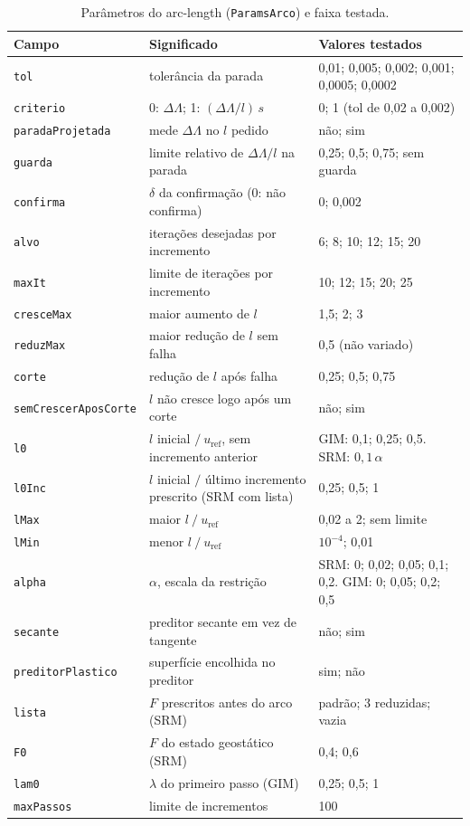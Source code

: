 \documentclass[11pt,a4paper]{article}
\numberwithin{equation}{section}
\begin{document}
\begin{table}[htbp]
\centering\footnotesize
\caption{Parâmetros do arc-length (\texttt{ParamsArco}) e faixa testada.}\label{tab:params_arco}
\begin{tabular}{lp{7.6cm}p{4.6cm}}
\toprule
Campo & Significado & Valores testados \\
\midrule
\texttt{tol} & tolerância da parada & 0,01; 0,005; 0,002; 0,001; 0,0005; 0,0002 \\
\texttt{criterio} & 0: $\Delta\Lambda$; 1: $(\Delta\Lambda/l)\,s$ & 0; 1 (tol de 0,02 a 0,002) \\
\texttt{paradaProjetada} & mede $\Delta\Lambda$ no $l$ pedido & não; sim \\
\texttt{guarda} & limite relativo de $\Delta\Lambda/l$ na parada & 0,25; 0,5; 0,75; sem guarda \\
\texttt{confirma} & $\delta$ da confirmação (0: não confirma) & 0; 0,002 \\
\texttt{alvo} & iterações desejadas por incremento & 6; 8; 10; 12; 15; 20 \\
\texttt{maxIt} & limite de iterações por incremento & 10; 12; 15; 20; 25 \\
\texttt{cresceMax} & maior aumento de $l$ & 1,5; 2; 3 \\
\texttt{reduzMax} & maior redução de $l$ sem falha & 0,5 (não variado) \\
\texttt{corte} & redução de $l$ após falha & 0,25; 0,5; 0,75 \\
\texttt{semCrescerAposCorte} & $l$ não cresce logo após um corte & não; sim \\
\texttt{l0} & $l$ inicial $/\ u_{\mathrm{ref}}$, sem incremento anterior & GIM: 0,1; 0,25; 0,5. SRM: $0{,}1\,\alpha$ \\
\texttt{l0Inc} & $l$ inicial $/$ último incremento prescrito (SRM com lista) & 0,25; 0,5; 1 \\
\texttt{lMax} & maior $l\ /\ u_{\mathrm{ref}}$ & 0,02 a 2; sem limite \\
\texttt{lMin} & menor $l\ /\ u_{\mathrm{ref}}$ & $10^{-4}$; 0,01 \\
\texttt{alpha} & $\alpha$, escala da restrição & SRM: 0; 0,02; 0,05; 0,1; 0,2. GIM: 0; 0,05; 0,2; 0,5 \\
\texttt{secante} & preditor secante em vez de tangente & não; sim \\
\texttt{preditorPlastico} & superfície encolhida no preditor & sim; não \\
\texttt{lista} & $F$ prescritos antes do arco (SRM) & padrão; 3 reduzidas; vazia \\
\texttt{F0} & $F$ do estado geostático (SRM) & 0,4; 0,6 \\
\texttt{lam0} & $\lambda$ do primeiro passo (GIM) & 0,25; 0,5; 1 \\
\texttt{maxPassos} & limite de incrementos & 100 \\
\bottomrule
\end{tabular}
\end{table}
\end{document}
